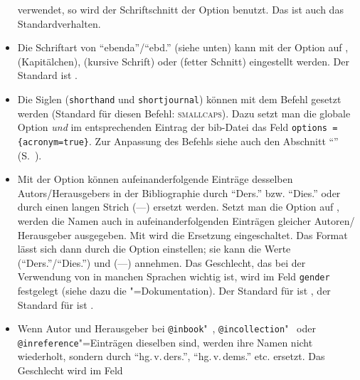 \documentclass[ngerman]{scrartcl}
\begin{document}
\begin{itemize}
	      verwendet, so wird der Schriftschnitt der Option  
	      benutzt. Das ist auch das Standardverhalten.
	\item Die
	      Schriftart von \enquote{ebenda}\slash\enquote{ebd.} (siehe unten) 
	      kann mit der Option  auf , 
	       (Kapitälchen),  (kursive Schrift) oder 
	       (fetter Schnitt) eingestellt werden. Der Standard ist 
	      .	      
  \item Die
	      Siglen (\texttt{shorthand} und \texttt{shortjournal}) können mit
        dem
	      Befehl  gesetzt werden (Standard für diesen Befehl:
        \textsc{smallcaps}). Dazu setzt man die globale Option 
        \emph{und} im entsprechenden Eintrag der bib-Datei das Feld 
        \texttt{options = \{acronym=true\}}. Zur Anpassung des Befehls
         siehe auch den Abschnitt \enquote{}
        (S.~\pageref{mkbibacro-anpassen}).
	\item Mit
	      der Option  können aufeinanderfolgende Einträge 
	      desselben Autors\slash{}Herausgebers in der Bibliographie durch 
	      \enquote{Ders.} bzw. \enquote{Dies.} oder durch einen langen Strich
	      (---) ersetzt werden. Setzt man die Option auf , werden
	      die Namen auch in aufeinanderfolgenden Einträgen gleicher Autoren\slash
	      Herausgeber ausgegeben. Mit  wird die Ersetzung 
	      eingeschaltet. Das Format lässt sich dann durch die Option
	       einstellen; sie kann die Werte  
	      (\enquote{Ders.}\slash\enquote{Dies.}) und  (---) annehmen. 
	      Das Geschlecht, das bei der Verwendung von  in manchen 
	      Sprachen 
	      wichtig ist, wird im Feld  \texttt{gender} festgelegt (siehe dazu die 
	      \bl"=Dokumentation). Der Standard für  ist 
	      , 
	      der Standard für  ist .
	\item Wenn
	      Autor und Herausgeber bei \texttt{@inbook}"~, \texttt{@incollection}"~ oder 
	      \texttt{@inreference}"=Einträgen dieselben sind, werden ihre Namen nicht 
	      wiederholt, sondern durch \enquote{hg.\,v.\,ders.}, 
	      \enquote{hg.\,v.\,dems.} etc. ersetzt. Das Geschlecht wird im Feld

\end{itemize}
\end{document}

